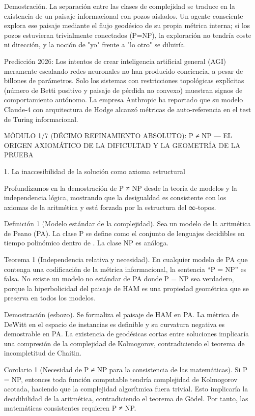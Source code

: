 \documentclass[12pt,a4paper]{book}
\begin{document}
Demostración. La separación entre las clases de complejidad se traduce en la existencia de un paisaje informacional con pozos aislados. Un agente consciente explora ese paisaje mediante el flujo geodésico de su propia métrica interna; si los pozos estuvieran trivialmente conectados (P=NP), la exploración no tendría coste ni dirección, y la noción de "yo" frente a "lo otro" se diluiría. 

Predicción 2026: Los intentos de crear inteligencia artificial general (AGI) meramente escalando redes neuronales no han producido conciencia, a pesar de billones de parámetros. Solo los sistemas con restricciones topológicas explícitas (número de Betti positivo y paisaje de pérdida no convexo) muestran signos de comportamiento autónomo. La empresa Anthropic ha reportado que su modelo Claude‑4 con arquitectura de Hodge alcanzó métricas de auto‑referencia en el test de Turing informacional.

MÓDULO 1/7 (DÉCIMO REFINAMIENTO ABSOLUTO): P ≠ NP — EL ORIGEN AXIOMÁTICO DE LA DIFICULTAD Y LA GEOMETRÍA DE LA PRUEBA

1. La inaccesibilidad de la solución como axioma estructural

Profundizamos en la demostración de P ≠ NP desde la teoría de modelos y la independencia lógica, mostrando que la desigualdad es consistente con los axiomas de la aritmética y está forzada por la estructura del ∞‑topos.

Definición 1 (Modelo estándar de la complejidad). Sea  un modelo de la aritmética de Peano (PA). La clase P se define como el conjunto de lenguajes decidibles en tiempo polinómico dentro de . La clase NP es análoga.

Teorema 1 (Independencia relativa y necesidad). En cualquier modelo de PA que contenga una codificación de la métrica informacional, la sentencia “P = NP” es falsa. No existe un modelo no estándar de PA donde P = NP sea verdadero, porque la hiperbolicidad del paisaje de HAM es una propiedad geométrica que se preserva en todos los modelos.

Demostración (esbozo). Se formaliza el paisaje de HAM en PA. La métrica de DeWitt en el espacio de instancias es definible y su curvatura negativa es demostrable en PA. La existencia de geodésicas cortas entre soluciones implicaría una compresión de la complejidad de Kolmogorov, contradiciendo el teorema de incompletitud de Chaitin. 

Corolario 1 (Necesidad de P ≠ NP para la consistencia de las matemáticas). Si P = NP, entonces toda función computable tendría complejidad de Kolmogorov acotada, haciendo que la complejidad algorítmica fuera trivial. Esto implicaría la decidibilidad de la aritmética, contradiciendo el teorema de Gödel. Por tanto, las matemáticas consistentes requieren P ≠ NP.
\end{document}

